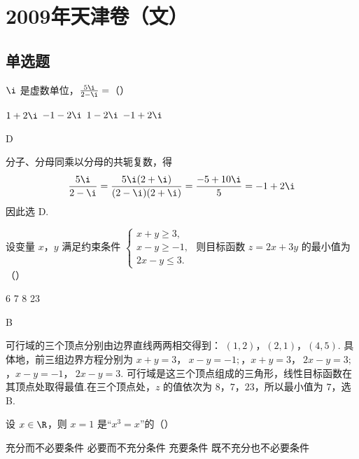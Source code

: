 \chapter{2009年天津卷（文）}

\section{单选题}

\begin{problem}
\(\i\) 是虚数单位，\(\frac{5\i}{2 - \i} =\)（\quad）

\choices
    {\(1 + 2\i\)}
    {\(-1 - 2\i\)}
    {\(1 - 2\i\)}
    {\(-1 + 2\i\)}
\end{problem}

\begin{answer}
D
\end{answer}

\begin{solution}
分子、分母同乘以分母的共轭复数，得
\[
\frac{5\i}{2-\i}=\frac{5\i(2+\i)}{(2-\i)(2+\i)}=\frac{-5+10\i}{5}=-1+2\i
\]
因此选 D.
\end{solution}

\begin{problem}
设变量 \(x\)，\(y\) 满足约束条件 \(\begin{cases}
x + y \geqslant 3,\\
x - y \geqslant -1,\\
2x - y \leqslant 3.
\end{cases}\) 则目标函数 \(z = 2x + 3y\) 的最小值为（\quad）

\choices
    {6}
    {7}
    {8}
    {23}
\end{problem}

\begin{answer}
B
\end{answer}

\begin{solution}
可行域的三个顶点分别由边界直线两两相交得到：
\((1,2)\)，\((2,1)\)，\((4,5)\).
具体地，前三组边界方程分别为
\(x+y=3\)，\(\ x-y=-1;\)，\(x+y=3\)，\(\ 2x-y=3;\)，\(x-y=-1\)，\(\ 2x-y=3\).
可行域是这三个顶点组成的三角形，线性目标函数在其顶点处取得最值.在三个顶点处，\(z\) 的值依次为 \(8\)，\(7\)，\(23\)，所以最小值为 \(7\)，选 B.
\end{solution}

\begin{problem}
设 \(x \in \R\)，则 \(x = 1\) 是“\(x^3 = x\)”的（\quad）

\choices
    {充分而不必要条件}
    {必要而不充分条件}
    {充要条件}
    {既不充分也不必要条件}
\end{problem}

